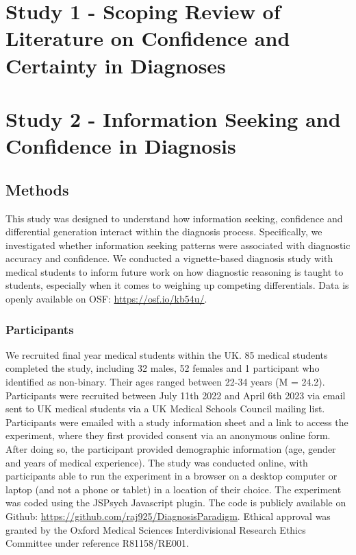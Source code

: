 \documentclass[a4paper, nobind]{templates/ociamthesis}
\begin{document}
\chapter*{Study 1 - Scoping Review of Literature on Confidence and Certainty in Diagnoses}\label{study-1---scoping-review-of-literature-on-confidence-and-certainty-in-diagnoses}

\adjustmtc
{}

\chapter*{Study 2 - Information Seeking and Confidence in Diagnosis}\label{study-2---information-seeking-and-confidence-in-diagnosis}

\adjustmtc
{}

\section*{Methods}\label{methods}

This study was designed to understand how information seeking, confidence and differential generation interact within the diagnosis process. Specifically, we investigated whether information seeking patterns were associated with diagnostic accuracy and confidence. We conducted a vignette-based diagnosis study with medical students to inform future work on how diagnostic reasoning is taught to students, especially when it comes to weighing up competing differentials. Data is openly available on OSF: \url{https://osf.io/kb54u/}.

\subsection*{Participants}\label{participants}

We recruited final year medical students within the UK. 85 medical students completed the study, including 32 males, 52 females and 1 participant who identified as non-binary. Their ages ranged between 22-34 years (M = 24.2). Participants were recruited between July 11th 2022 and April 6th 2023 via email sent to UK medical students via a UK Medical Schools Council mailing list. Participants were emailed with a study information sheet and a link to access the experiment, where they first provided consent via an anonymous online form. After doing so, the participant provided demographic information (age, gender and years of medical experience). The study was conducted online, with participants able to run the experiment in a browser on a desktop computer or laptop (and not a phone or tablet) in a location of their choice. The experiment was coded using the JSPsych Javascript plugin. The code is publicly available on Github: \url{https://github.com/raj925/DiagnosisParadigm}. Ethical approval was granted by the Oxford Medical Sciences Interdivisional Research Ethics Committee under reference R81158/RE001.
\end{document}
